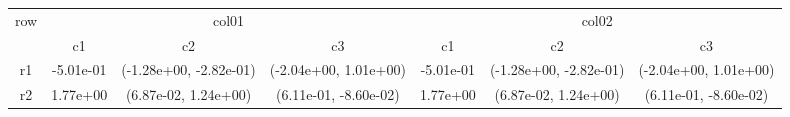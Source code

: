 \begin{tabular}{ccccccc}
\toprule
\multirow{2}{*}{row}&\multicolumn{3}{c}{col01}&\multicolumn{3}{c}{col02}\tabularnewline
\cmidrule(lr){2-4}
\cmidrule(lr){5-7}
&c1&c2&c3&c1&c2&c3\tabularnewline
\midrule
r1&-5.01e-01& (-1.28e+00, -2.82e-01)& (-2.04e+00, 1.01e+00)&-5.01e-01& (-1.28e+00, -2.82e-01)& (-2.04e+00, 1.01e+00)\tabularnewline
r2&1.77e+00& (6.87e-02, 1.24e+00)& (6.11e-01, -8.60e-02)&1.77e+00& (6.87e-02, 1.24e+00)& (6.11e-01, -8.60e-02)\tabularnewline
\bottomrule
\end{tabular}
